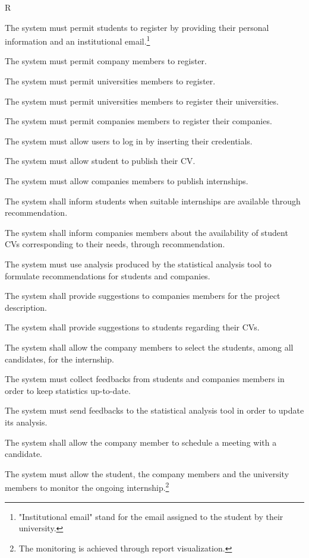 \begin{listInSquareBrackets}{R}
    \item The system must permit students to register by providing their personal information and an institutional email.\footnote{"Institutional email" stand for the email assigned to the student by their university.}
    \item The system must permit company members to register.
    \item The system must permit universities members to register.
    \item The system must permit universities members to register their universities.
    \item The system must permit companies members to register their companies.
    \item The system must allow users to log in by inserting their credentials.
    \item The system must allow student to publish their CV.
    \item The system must allow companies members to publish internships.
    \item The system shall inform students when suitable internships are available through recommendation.
    \item The system shall inform companies members about the availability of student CVs corresponding to their needs, through recommendation.
    \item The system must use analysis produced by the statistical analysis tool to formulate recommendations for students and companies.
    \item The system shall provide suggestions to companies members for the project description.
    \item The system shall provide suggestions to students regarding their CVs.
    \item The system shall allow the company members to select the students, among all candidates, for the internship.
    \item The system must collect feedbacks from students and companies members in order to keep statistics up-to-date.
    \item The system must send feedbacks to the statistical analysis tool in order to update its analysis.
    \item The system shall allow the company member to schedule a meeting with a candidate.
    \item The system must allow the student, the company members and the university members to monitor the ongoing internship.\footnote{The monitoring is achieved through report visualization.}

\end{listInSquareBrackets}
